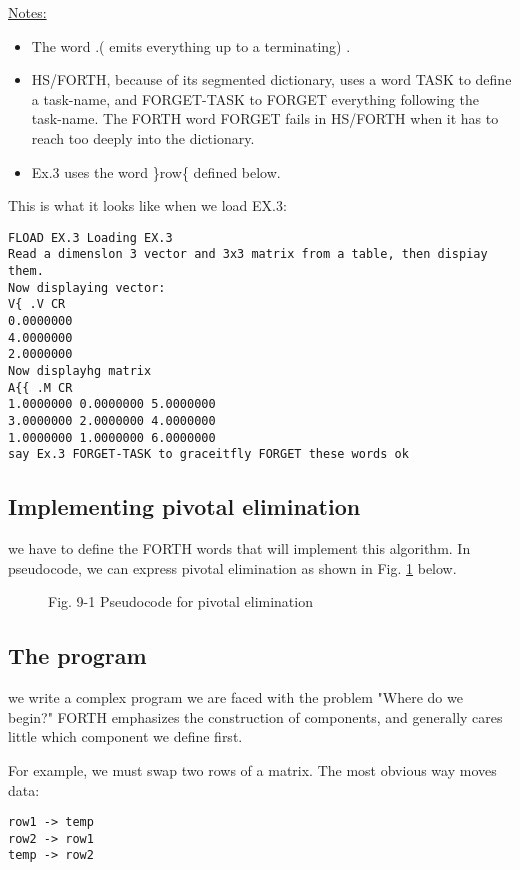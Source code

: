 \underline{Notes:}

\begin{itemize}
  \item The word .( emits everything up to a terminating) .
  \item HS/FORTH, because of its segmented dictionary, uses a word TASK to define a task-name, and FORGET-TASK to FORGET everything following the task-name. The FORTH word FORGET fails in HS/FORTH when it has to reach too deeply into the dictionary.
  \item Ex.3 uses the word \}row\{ defined below.
\end{itemize}

This is what it looks like when we load EX.3:

\begin{verbatim}
FLOAD EX.3 Loading EX.3
Read a dimenslon 3 vector and 3x3 matrix from a table, then dispiay them.
Now displaying vector:
V{ .V CR
0.0000000
4.0000000
2.0000000
Now displayhg matrix 
A{{ .M CR
1.0000000 0.0000000 5.0000000 
3.0000000 2.0000000 4.0000000
1.0000000 1.0000000 6.0000000
say Ex.3 FORGET-TASK to graceitfly FORGET these words ok 
\end{verbatim}

\subsection{Implementing pivotal elimination}
 we have to define the FORTH words that will implement
this algorithm. In pseudocode, we can express pivotal elimination as shown in Fig. \ref{fig:09_01} below.

 
\begin{figure}
    \caption{
        Fig. 9-1 Pseudocode for pivotal elimination}
    \label{fig:09_01}
\end{figure}
\subsection{The program}
 we write a complex program we are faced with the
problem "Where do we begin?" FORTH emphasizes the construction of components,
and generally cares little which component
we define first.

For example, we must swap two rows of a matrix. The most
obvious way moves data:

\begin{verbatim}
row1 -> temp
row2 -> row1
temp -> row2
\end{verbatim}

